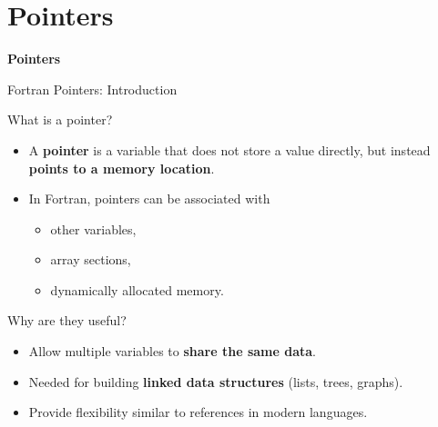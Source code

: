 \section{Pointers}

\begin{frame}
	\centering
	\Huge \textbf{Pointers}
\end{frame}

\begin{frame}{Fortran Pointers: Introduction}
  \begin{block}{What is a pointer?}
    \begin{itemize}
      \item A \textbf{pointer} is a variable that does not store a value directly,
            but instead \textbf{points to a memory location}.
      \item In Fortran, pointers can be associated with
            \begin{itemize}
              \item other variables,
              \item array sections,
              \item dynamically allocated memory.
            \end{itemize}
    \end{itemize}
  \end{block}

  \begin{block}{Why are they useful?}
    \begin{itemize}
      \item Allow multiple variables to \textbf{share the same data}.
      \item Needed for building \textbf{linked data structures}
            (lists, trees, graphs).
      \item Provide flexibility similar to references in modern languages.
    \end{itemize}
  \end{block}
\end{frame}


